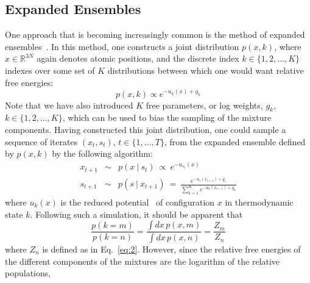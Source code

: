 \subsection{Expanded Ensembles}
One approach that is becoming increasingly common is the method of expanded ensembles~\cite{lyubartsev1992}.
%
In this method, one constructs a joint distribution $p(x, k)$, where $x \in \mathbb{R}^{3N}$ again denotes atomic positions, and the discrete index $k \in \{1, 2, \ldots, K\}$ indexes over some set of $K$ distributions between which one would want relative free energies:
%
\begin{equation} \label{exen}
    p(x, k) \propto e^{-u_k(x) + g_k}
\end{equation}
%
%
Note that we have also introduced $K$ free parameters, or log weights, $g_k$, $k \in \{1, 2, \ldots, K\}$, which can be used to bias the sampling of the mixture components.
%
%
Having constructed this joint distribution, one could sample a sequence of iterates $(x_t, s_t)$, $t \in \{1,\ldots, T\}$, from the expanded ensemble defined by $p(x, k)$ by the following algorithm:
\begin{eqnarray} \label{sampling_lambda_exen}
    x_{t+1} &\sim& p(x~|~s_t) \: \propto \: e^{-u_{s_t}(x)} \\
    s_{t+1} &\sim& p(s~|~x_{t+1}) \: = \: \frac{e^{-u_s(x_{t+1}) + g_s}}{\sum\limits_{k=1}^{K} e^{-u_k(x_{t+1}) + g_k}}
\end{eqnarray}
%
where $u_k(x)$ is the reduced potential~\cite{Shirts2008,chodera2011} of configuration $x$ in thermodynamic state $k$.
%
Following such a simulation, it should be apparent that
%
\begin{equation}
    \frac{p(k = m)}{p(k = n)} = \frac{\int dx \, p(x, m)}{\int dx \, p(x, n)} = \frac{Z_m}{Z_n}
\end{equation}
%
where $Z_n$ is defined as in Eq.~\ref{eq:2}.
%
However, since the relative free energies of the different components of the mixtures are the logarithm of the relative populations, 
